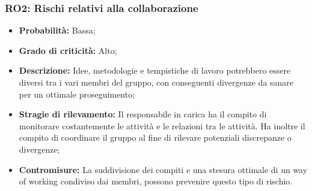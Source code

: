 \subsubsection{RO2: Rischi relativi alla collaborazione}
\begin{itemize}
    \item \textbf{Probabilità:} Bassa;
    \item \textbf{Grado di criticità:} Alto;
    \item \textbf{Descrizione:} Idee, metodologie e tempistiche di lavoro potrebbero essere diversi tra i vari membri del gruppo, con conseguenti divergenze da sanare per un ottimale proseguimento;
    \item \textbf{Stragie di rilevamento:} Il responsabile in carica ha il compito di monitorare costantemente le attività e le relazioni tra le attività. Ha inoltre il compito di coordinare il gruppo al fine di rilevare potenziali discrepanze o divergenze;
    \item \textbf{Contromisure:} La suddivisione dei compiti e una stesura ottimale di un way of working condiviso dai membri, possono prevenire questo tipo di rischio.
\end{itemize}

